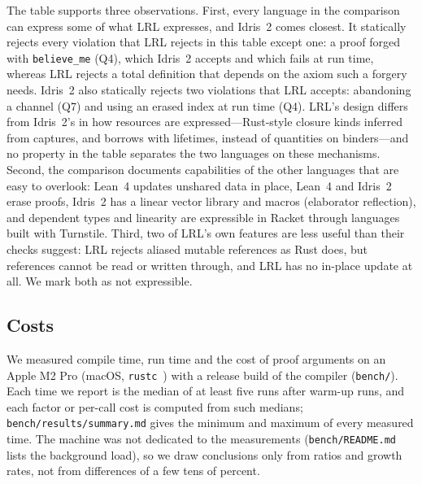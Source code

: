 The table supports three observations.
First, every language in the comparison can express some of what LRL expresses, and Idris~2 comes closest.
It statically rejects every violation that LRL rejects in this table except one: a proof forged with \lstinline|believe_me| (Q4), which Idris~2 accepts and which fails at run time, whereas LRL rejects a total definition that depends on the axiom such a forgery needs.
Idris~2 also statically rejects two violations that LRL accepts: abandoning a channel (Q7) and using an erased index at run time (Q4).
LRL's design differs from Idris~2's in how resources are expressed---Rust-style closure kinds inferred from captures, and borrows with lifetimes, instead of quantities on binders---and no property in the table separates the two languages on these mechanisms.
Second, the comparison documents capabilities of the other languages that are easy to overlook: Lean~4 updates unshared data in place, Lean~4 and Idris~2 erase proofs, Idris~2 has a linear vector library and macros (elaborator reflection), and dependent types and linearity are expressible in Racket through languages built with Turnstile.
Third, two of LRL's own features are less useful than their checks suggest: LRL rejects aliased mutable references as Rust does, but references cannot be read or written through, and LRL has no in-place update at all.
We mark both as not expressible.

\subsection{Costs}\label{sec:eval:cost}

We measured compile time, run time and the cost of proof arguments on an Apple M2 Pro (macOS, \texttt{rustc}~\ToolRustc) with a release build of the compiler (\texttt{bench/}).
Each time we report is the median of at least five runs after warm-up runs, and each factor or per-call cost is computed from such medians; \texttt{bench/\allowbreak results/\allowbreak summary.md} gives the minimum and maximum of every measured time.
The machine was not dedicated to the measurements (\texttt{bench/\allowbreak README.md} lists the background load), so we draw conclusions only from ratios and growth rates, not from differences of a few tens of percent.

